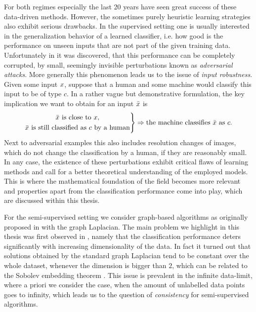 For both regimes especially the last 20 years have seen great success of these data-driven methods. However, the sometimes purely heuristic learning strategies also exhibit serious drawbacks. In the supervised setting one is usually interested in the generalization behavior of a learned classifier, i.e. how good is the performance on unseen inputs that are not part of the given training data. Unfortunately in \cite{goodfellow2014explaining} it was discovered, that this performance can be completely corrupted, by small, seemingly invisible perturbations known as \textit{adversarial attacks}. More generally this phenomenon leads us to the issue of \textit{input robustness}. Given some input $x$, suppose that a human and some machine would classify this input to be of type $c$. In a rather vague but demonstrative formulation, the key implication we want to obtain for an input $\bar{x}$ is
%
\begin{align*}
\left.
\begin{gathered}
\bar{x}\text{ is close to }x,\\
\bar{x}\text{ is still classified as }c\text{ by a human}
\end{gathered}
\right\}
\Rightarrow
\text{the machine classifies }\bar{x}\text{ as } c. 
\end{align*}
%
Next to adversarial examples this also includes resolution changes of images, which do not change the classification by a human, if they are reasonably small. In any case, the existence of these perturbations exhibit critical flaws of learning methods and call for a better theoretical understanding of the employed models. This is where the mathematical foundation of the field becomes more relevant and properties apart from the classification performance come into play, which are discussed within this thesis.

For the semi-supervised setting we consider graph-based algorithms as originally proposed in \cite{zhu2003semi} with the graph Laplacian. The main problem we highlight in this thesis was first observed in \cite{nadler2009statistical}, namely that the classification performance deters significantly with increasing dimensionality of the data. In fact it turned out that solutions obtained by the standard graph Laplacian tend to be constant over the whole dataset, whenever the dimension is bigger than $2$, which can be related to the Sobolev embedding theorem \cite{adams2003sobolev}. This issue is prevalent in the infinite data-limit, where a priori we consider the case, when the amount of unlabelled data points goes to infinity, which leads us to the question of \textit{consistency} for semi-supervised algorithms.

